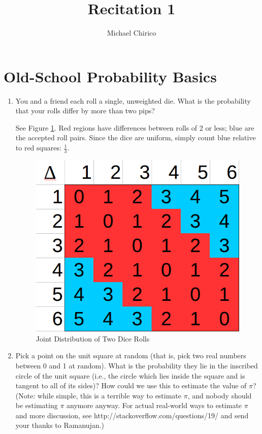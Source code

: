 \documentclass{article}
\newenvironment{solution}{\color{red}}{\color{black}}
\begin{document}
\title{Recitation 1}
\author{Michael Chirico}

\maketitle

\section{Old-School Probability Basics}

\begin{enumerate}
\item You and a friend each roll a single, unweighted die. What is the probability that your rolls differ by more than two pips?

\begin{solution}
See Figure \ref{fig:dice}. Red regions have differences between rolls of 2 or less; blue are the accepted roll pairs. Since the dice are uniform, simply count blue relative to red squares: $\frac13$.

\begin{figure}[htbp]
\centering
\caption{Joint Distribution of Two Dice Rolls}
\label{fig:dice}
\includegraphics[width = .5\textwidth]{recitation160901_fig1.png}
\end{figure}
\end{solution}

\item Pick a point on the unit square at random (that is, pick two real numbers between 0 and 1 at random). What is the probability they lie in the inscribed circle of the unit square (i.e., the circle which lies inside the square and is tangent to all of its sides)? How could we use this to estimate the value of $\pi$? (Note: while simple, this is a terrible way to estimate $\pi$, and nobody should be estimating $\pi$ anymore anyway. For actual real-world ways to estimate $\pi$ and more discussion, see http://stackoverflow.com/questions/19/ and send your thanks to Ramanujan.)


\end{enumerate}
\end{document}

